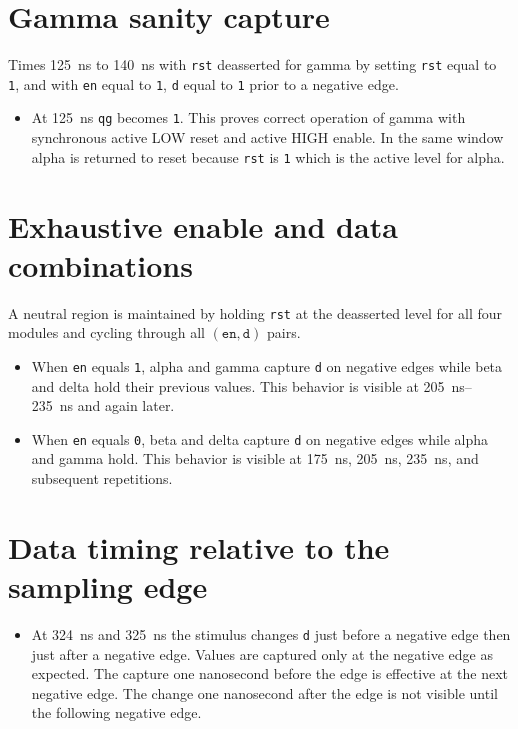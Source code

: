 \documentclass[11pt]{article}
\begin{document}
\section*{Gamma sanity capture}
Times \SI{125}{ns} to \SI{140}{ns} with \texttt{rst} deasserted for gamma by setting \texttt{rst} equal to \texttt{1}, and with \texttt{en} equal to \texttt{1}, \texttt{d} equal to \texttt{1} prior to a negative edge.
\begin{itemize}
  \item At \SI{125}{ns} \texttt{qg} becomes \texttt{1}. This proves correct operation of gamma with synchronous active LOW reset and active HIGH enable. In the same window alpha is returned to reset because \texttt{rst} is \texttt{1} which is the active level for alpha.
\end{itemize}

\section*{Exhaustive enable and data combinations}
A neutral region is maintained by holding \texttt{rst} at the deasserted level for all four modules and cycling through all \((\texttt{en},\texttt{d})\) pairs.
\begin{itemize}
  \item When \texttt{en} equals \texttt{1}, alpha and gamma capture \texttt{d} on negative edges while beta and delta hold their previous values. This behavior is visible at \SIrange{205}{235}{ns} and again later.
  \item When \texttt{en} equals \texttt{0}, beta and delta capture \texttt{d} on negative edges while alpha and gamma hold. This behavior is visible at \SI{175}{ns}, \SI{205}{ns}, \SI{235}{ns}, and subsequent repetitions.
\end{itemize}

\section*{Data timing relative to the sampling edge}
\begin{itemize}
  \item At \SI{324}{ns} and \SI{325}{ns} the stimulus changes \texttt{d} just before a negative edge then just after a negative edge. Values are captured only at the negative edge as expected. The capture one nanosecond before the edge is effective at the next negative edge. The change one nanosecond after the edge is not visible until the following negative edge.
\end{itemize}
\end{document}
